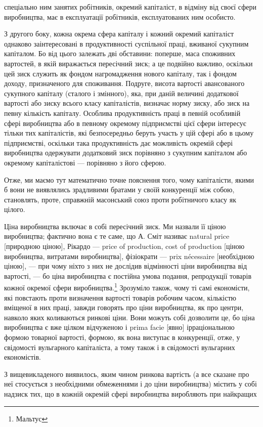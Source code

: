 спеціально ним занятих робітників, окремий капіталіст, в відміну
від своєї сфери виробництва, має в експлуатації робітників, експлуатованих
ним особисто.

З другого боку, кожна окрема сфера капіталу і кожний окремий
капіталіст однаково заінтересовані в продуктивності суспільної
праці, вживаної сукупним капіталом. Бо від цього залежать
дві обставини: поперше, маса споживних вартостей, в якій виражається
пересічний зиск; а це подвійно важливо, оскільки цей
зиск служить як фондом нагромадження нового капіталу, так
і фондом доходу, призначеного для споживання. Подруге, висота
вартості авансованого сукупного капіталу (сталого і змінного),
яка, при даній величині додаткової вартості або зиску всього
класу капіталістів, визначає норму зиску, або зиск на певну
кількість капіталу. Особлива продуктивність праці в певній
особливій сфері виробництва або в певному окремому підприємстві
цієї сфери інтересує тільки тих капіталістів, які безпосередньо
беруть участь у цій сфері або в цьому підприємстві,
оскільки така продуктивність дає можливість окремій сфері
виробництва одержувати додатковий зиск порівняно з сукупним
капіталом або окремому капіталістові — порівняно з його сферою.

Отже, ми маємо тут математично точне пояснення того,
чому капіталісти, якими б вони не виявлялись зрадливими братами
у своїй конкуренції між собою, становлять, проте, справжній
масонський союз проти робітничого класу як цілого.

Ціна виробництва включає в собі пересічний зиск. Ми назвали
її ціною виробництва; фактично вона є те саме, що А. Сміт називає
natural price [природною ціною], Рікардо — price of production,
cost of production [ціною виробництва, витратами виробництва],
фізіократи — prix nécessaire [необхідною ціною], — при
чому ніхто з них не дослідив відмінності ціни виробництва від
вартості, — бо ціна виробництва є постійна умова подання, репродукції
товарів кожної окремої сфери виробництва.\footnote{
Мальтус
} Зрозуміло
також, чому ті самі економісти, які повстають проти визначення
вартості товарів робочим часом, кількістю вміщеної в них праці,
завжди говорять про ціни виробництва, як про центри, навколо
яких коливаються ринкові ціни. Вони можуть собі дозволити це,
бо ціна виробництва є вже цілком відчуженою і prima facie [явно]
ірраціональною формою товарної вартості, формою, як вона виступає
в конкуренції, отже, у свідомості вульгарного капіталіста,
а тому також і в свідомості вульгарних економістів.

З вищевикладеного виявилось, яким чином ринкова вартість
(а все сказане про неї стосується з необхідними обмеженнями
і до ціни виробництва) містить у собі надзиск тих, що в кожній
окремій сфері виробництва виробляють при найкращих